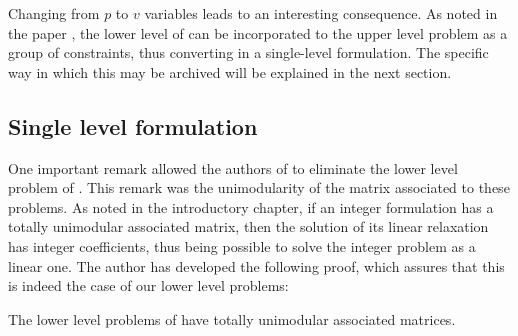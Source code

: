 Changing from $p$ to $v$ variables leads to an interesting consequence. As noted
in the paper \cite{ca:rpp}, the lower level of \bnlv can be incorporated to the
upper level problem as a group of constraints, thus converting \bnlv in a
single-level formulation. The specific way in which this may be archived will be
explained in the next section.

\subsection{Single level formulation} %
\label{ssc:pf:bf:bnl}

One important remark allowed the authors of \cite{ca:rpp} to eliminate the
lower level problem of \bnlv. This remark was the unimodularity of the matrix
associated to these problems. As noted in the introductory chapter, if an
integer formulation has a totally unimodular associated matrix, then the
solution of its linear relaxation has integer coefficients, thus being possible
to solve the integer problem as a linear one. The author has developed the
following proof, which assures that this is indeed the case of our lower level
problems:

\begin{lemma}
    The lower level problems of \bnlv have totally unimodular associated
    matrices.
\end{lemma}

